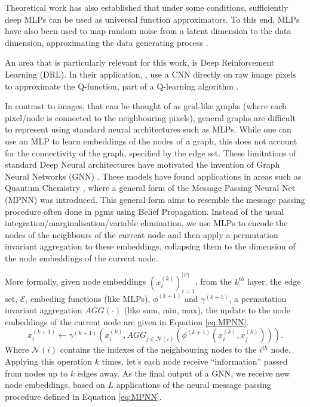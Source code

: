 \documentclass{report}
\numberwithin{equation}{section}
\numberwithin{figure}{section}
\numberwithin{table}{section}
\numberwithin{algorithm}{section}
\begin{document}
Theoretical work \citep{UnivApproxNN} has also established
that under some conditions, sufficiently deep MLPs 
can be used as universal function approximators. To this end, 
MLPs have also been used to map random noise from a latent 
dimension to the data dimension, approximating 
the data generating process \citep{goodfellow2014generative,VAEs}.

An area that is particularly relevant for this work, 
is Deep Reinforcement Learning 
(DRL). In their application, \cite{DQN}, use a CNN directly on 
raw image pixels to approximate the Q-function, part of a 
Q-learning algorithm \citep{QlearningWatkins1992}. 

In contrast to images, that can be thought of as grid-like graphs 
(where each pixel/node is connected to the neighbouring pixels), 
general graphs are difficult to represent using standard 
neural architectures such as MLPs. While one can use an MLP 
to learn embeddings of the nodes of a graph, this does not 
account for the connectivity of the graph, specified by the edge set. 
These limitations of standard Deep Neural architectures 
have motivated the invention of Graph Neural Networks (GNN) \citep{ScarselliGNN}. 
These models have found applications in areas such as 
Quantum Chemistry \citep{MPNNs}, where 
a general form of the Message Passing Neural Net (MPNN) was 
introduced. This general form aims to resemble the message passing 
procedure often done in pgms using Belief Propagation. Instead 
of the usual integration/marginalisation/variable elimination, 
we use MLPs to encode the nodes of the neighbours of the current 
node and then apply a permutation invariant aggregation to 
these embeddings, collapsing them to the dimension of the node 
embeddings of the current node.

More formally, given node embeddings $(x_i^{(k)})_{i=1}^{|\mathcal{V}|}$, 
from the $k^{th}$ layer, the edge set, $\mathcal{E}$, embeding 
functions (like MLPs), $\phi^{(k+1)}$ and $\gamma^{(k+1)}$, 
a permutation invariant 
aggregation $AGG(\cdot)$ (like sum, min, max), the update to 
the node embeddings of the current node are given in Equation 
\ref{eq:MPNN}.
\begin{equation}\label{eq:MPNN}
  x_i^{(k+1)}\gets \gamma^{(k+1)}\left(
    x_i^{(k)}, 
    AGG_{j\in\mathcal{N}(i)}\left(
      \phi^{(k+1)}\left(x_i^{(k)}, x_j^{(k)}\right)\right)
  \right).
\end{equation}
Where $\mathcal{N}(i)$ contains the indexes of the neighbouring nodes 
to the $i^{th}$ node. Applying this operation $k$ times, let's 
each node receive ``information'' passed from nodes up to 
$k$ edges away. As the final output of a GNN, we receive 
new node embeddings, based on $L$ applications of the neural 
message passing procedure defined in Equation \ref{eq:MPNN}.
\end{document}
